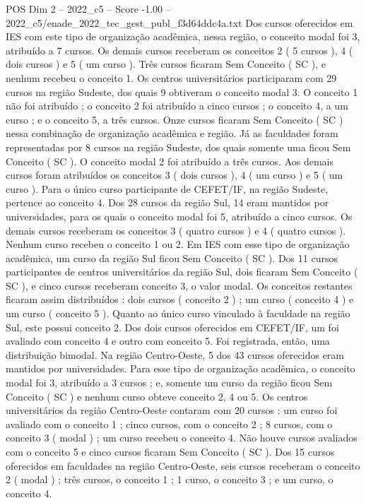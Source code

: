 \begin{textsample}{POS Dim 2 – 2022\_c5 – Score -1.00 – 2022\_c5/enade\_2022\_tec\_gest\_publ\_f3d64ddc4a.txt}
Dos cursos oferecidos em IES com este tipo de organização acadêmica, nessa região, o conceito modal foi 3, atribuído a 7 cursos.
Os demais cursos receberam os conceitos 2 ( 5 cursos ), 4 ( dois cursos ) e 5 ( um curso ).
Três cursos ficaram Sem Conceito ( SC ), e nenhum recebeu o conceito 1.
Os centros universitários participaram com 29 cursos na região Sudeste, dos quais 9 obtiveram o conceito modal 3.
O conceito 1 não foi atribuído ; o conceito 2 foi atribuído a cinco cursos ; o conceito 4, a um curso ; e o conceito 5, a três cursos.
Onze cursos ficaram Sem Conceito ( SC ) nessa combinação de organização acadêmica e região.
Já as faculdades foram representadas por 8 cursos na região Sudeste, dos quais somente uma ficou Sem Conceito ( SC ).
O conceito modal 2 foi atribuído a três cursos.
Aos demais cursos foram atribuídos os conceitos 3 ( dois cursos ), 4 ( um curso ) e 5 ( um curso ).
Para o único curso participante de CEFET/IF, na região Sudeste, pertence ao conceito 4.
Dos 28 cursos da região Sul, 14 eram mantidos por universidades, para os quais o conceito modal foi 5, atribuído a cinco cursos.
Os demais cursos receberam os conceitos 3 ( quatro cursos ) e 4 ( quatro cursos ).
Nenhum curso recebeu o conceito 1 ou 2.
Em IES com esse tipo de organização acadêmica, um curso da região Sul ficou Sem Conceito ( SC ).
Dos 11 cursos participantes de centros universitários da região Sul, dois ficaram Sem Conceito ( SC ), e cinco cursos receberam conceito 3, o valor modal.
Os conceitos restantes ficaram assim distribuídos : dois cursos ( conceito 2 ) ; um curso ( conceito 4 ) e um curso ( conceito 5 ).
Quanto ao único curso vinculado à faculdade na região Sul, este possui conceito 2.
Dos dois cursos oferecidos em CEFET/IF, um foi avaliado com conceito 4 e outro com conceito 5.
Foi registrada, então, uma distribuição bimodal.
Na região Centro-Oeste, 5 dos 43 cursos oferecidos eram mantidos por universidades.
Para esse tipo de organização acadêmica, o conceito modal foi 3, atribuído a 3 cursos ; e, somente um curso da região ficou Sem Conceito ( SC ) e nenhum curso obteve conceito 2, 4 ou 5.
Os centros universitários da região Centro-Oeste contaram com 20 cursos : um curso foi avaliado com o conceito 1 ; cinco cursos, com o conceito 2 ; 8 cursos, com o conceito 3 ( modal ) ; um curso recebeu o conceito 4.
Não houve cursos avaliados com o conceito 5 e cinco cursos ficaram Sem Conceito ( SC ).
Dos 15 cursos oferecidos em faculdades na região Centro-Oeste, seis cursos receberam o conceito 2 ( modal ) ; três cursos, o conceito 1 ; 1 curso, o conceito 3 ; e um curso, o conceito 4.

\end{textsample}
